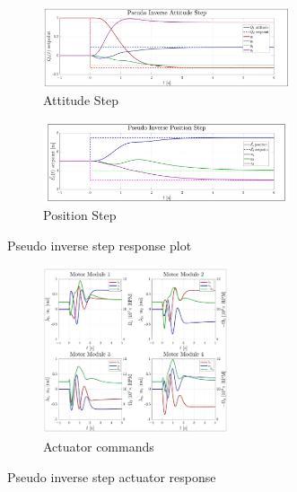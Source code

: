 \begin{figure}[hbtp]
\centering
\begin{subfigure}{\textwidth}
\centering
\includegraphics[width=0.8\textwidth]{graphs/pseudo_inverse_attitude}
\vspace{-4pt}
\caption{Attitude Step}
\label{fig:pseudo_inverse_attitude}
\end{subfigure}
\begin{subfigure}{\textwidth}
\vspace{-3pt}
\centering
\includegraphics[width=0.8\textwidth]{graphs/pseudo_inverse_position}
\caption{Position Step}
\label{fig:pseudo_inverse_position}
\end{subfigure}
\vspace{-2pt}
\caption{Pseudo inverse step response plot}
\label{fig:pseudo-inverse-step}
\vspace{-12pt}
\end{figure}
\par
\begin{figure}[htbp]
\ContinuedFloat
\begin{subfigure}{\textwidth}
\centering
\includegraphics[width=0.6\textwidth]{graphs/pseudo_inverse_input}
\vspace{-6pt}
\caption{Actuator commands}
\label{fig:pseudo_inverse_input}
\end{subfigure}
\vspace{-10pt}
\caption{Pseudo inverse step actuator response}
\vspace{-16pt}
\end{figure}
